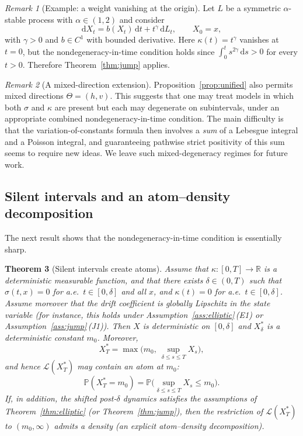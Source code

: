 \documentclass[11pt]{article}
\newcommand{\R}{\mathbb{R}}
\newcommand{\Pbb}{\mathbb{P}}
\newcommand{\1}{\mathbf{1}}
\newcommand{\law}{\mathcal{L}}
\newcommand{\dd}{\mathrm{d}}
\newcommand{\Xstar}{X^{\ast}}
\theoremstyle{plain}
\newtheorem{theorem}{Theorem}[section]
\theoremstyle{definition}
\theoremstyle{remark}
\newtheorem{remark}[theorem]{Remark}
\begin{document}
\begin{remark}[Example: a weight vanishing at the origin]
Let $L$ be a symmetric $\alpha$-stable process with $\alpha\in(1,2)$ and consider
\[
\dd X_t=b(X_t)\,\dd t+t^\gamma\,\dd L_t,\qquad X_0=x,
\]
with $\gamma>0$ and $b\in C^1$ with bounded derivative.
Here $\kappa(t)=t^\gamma$ vanishes at $t=0$, but the nondegeneracy-in-time condition holds since
$\int_0^t s^{2\gamma}\,\dd s>0$ for every $t>0$.
Therefore Theorem~\ref{thm:jump} applies.
\end{remark}

\begin{remark}[A mixed-direction extension]
Proposition~\ref{prop:unified} also permits mixed directions $\Theta=(h,v)$.
This suggests that one may treat models in which both $\sigma$ and $\kappa$ are present but each may degenerate on subintervals, under an appropriate combined nondegeneracy-in-time condition.
The main difficulty is that the variation-of-constants formula then involves a \emph{sum} of a Lebesgue integral and a Poisson integral, and guaranteeing pathwise strict positivity of this sum seems to require new ideas.
We leave such mixed-degeneracy regimes for future work.
\end{remark}

\subsection{Silent intervals and an atom--density decomposition}

The next result shows that the nondegeneracy-in-time condition is essentially sharp.

\begin{theorem}[Silent intervals create atoms]\label{thm:silent}
Assume that $\kappa:[0,T]\to\R$ is a deterministic measurable function, and that there exists $\delta\in(0,T)$ such that $\sigma(t,x)=0$ for a.e.\ $t\in[0,\delta]$ and all $x$,
and $\kappa(t)=0$ for a.e.\ $t\in[0,\delta]$.
Assume moreover that the drift coefficient is globally Lipschitz in the state variable (for instance, this holds under Assumption~\ref{ass:elliptic}\,\textup{(E1)} or Assumption~\ref{ass:jump}\,\textup{(J1)}).
Then $X$ is deterministic on $[0,\delta]$ and $\Xstar_\delta$ is a deterministic constant $m_0$.
Moreover,
\[
\Xstar_T=\max\Big(m_0,\ \sup_{\delta\le s\le T}X_s\Big),
\]
and hence $\law(\Xstar_T)$ may contain an atom at $m_0$:
\[
\Pbb(\Xstar_T=m_0)=\Pbb\Big(\sup_{\delta\le s\le T}X_s\le m_0\Big).
\]
If, in addition, the shifted post-$\delta$ dynamics satisfies the assumptions of Theorem~\ref{thm:elliptic} (or Theorem~\ref{thm:jump}),
then the restriction of $\law(\Xstar_T)$ to $(m_0,\infty)$ admits a density (an explicit atom--density decomposition).
\end{theorem}
\end{document}

